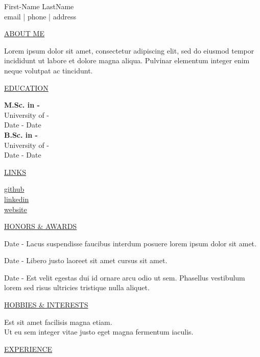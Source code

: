 \documentclass[11pt]{article}
\newcommand{\resumetitle}[3]{
    \AddToShipoutPictureBG{
        \AtPageUpperLeft {
        \raisebox{-0.09\paperheight}{
            \color{black!85}\rule{2\paperwidth}{\paperheight}}
        }}
    \begin{Center}
        \begingroup
        \titlethin
        \color{black!10}\Huge{#1}
        \titlethick
        \color{black!5}\Huge{#2} \\
        \vspace{2mm}
        \textrm{\color{black!15}\Large{#3}}
        \endgroup
    \end{Center}
    \vspace{7mm}
}
\newcommand{\betteruline}[1]{
    \uline{#1}
}
\newcommand{\sectiontitle}[1]{
    \begingroup
        \titlebold
        \betteruline{\Large\uppercase{#1}  }
        \vspace{1.7mm}
    \endgroup
}
\newcommand{\sectioncontent}[1]{
    \begingroup
        \begin{FlushLeft}
        \vspace{-3mm}
        \sffamily\small#1
        \end{FlushLeft}
    \endgroup
    \vspace{2mm}
}
\newcommand{\honor}[2]{
    \textcolor{black!70}{#1} - #2 \\
    \vspace{1.5mm}
}
\begin{document}
    \resumetitle{First-Name}{LastName} {
        email |
        phone |
        address
    }

    \setlength{\columnsep}{7mm}
    \begin{paracol}{2}

    \sectiontitle{about me}
    \sectioncontent{
        Lorem ipsum dolor sit amet, consectetur adipiscing elit, sed do eiusmod tempor incididunt ut labore et dolore magna aliqua. Pulvinar elementum integer enim neque volutpat ac tincidunt.
    }

    \sectiontitle{education}
    \sectioncontent{
        \textbf{M.Sc. in -} \\
        University of - \\
        \textcolor{black!70}{Date - Date} \\
        \vspace{2mm}
        \textbf{B.Sc. in -} \\
        University of - \\
        \textcolor{black!70}{Date - Date} \\
    }

    \sectiontitle{links}
    \sectioncontent{
        \hspace{2mm}
        \href{example.com}{github} \\
        \faIcon{linkedin-in}\hspace{2.1mm}
        \href{example.com}{linkedin} \\
        \faIcon{link}\hspace{1.8mm}
        \href{example.com}{website}
    }

    \sectiontitle{Honors \& Awards}
    \sectioncontent{
        \honor{Date}{Lacus suspendisse faucibus interdum posuere lorem ipsum dolor sit amet.}
        \honor{Date}{ Libero justo laoreet sit amet cursus sit amet.}
        \honor{Date}{ Est velit egestas dui id ornare arcu odio ut sem. Phasellus vestibulum lorem sed risus ultricies tristique nulla aliquet.}

    }

    \sectiontitle{Hobbies \& Interests}
    \sectioncontent{
        Est sit amet facilisis magna etiam.\\
        Ut eu sem integer vitae justo eget magna fermentum iaculis. \\
    }

    \switchcolumn

    \sectiontitle{experience}
    \sectioncontent{

}
\end{paracol}
\end{document}
